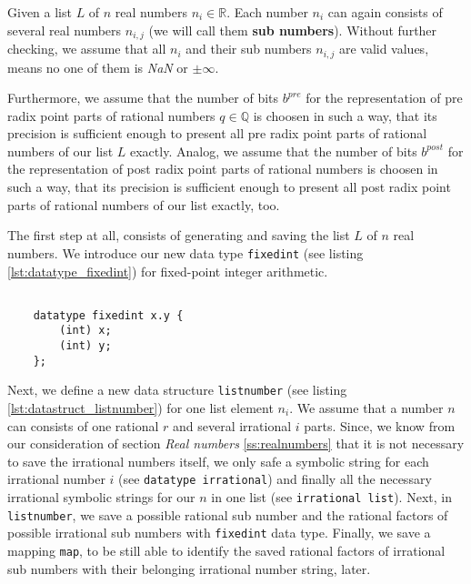 \begin{step}[Assumptions]
    Given a list $L$ of $n$ real numbers $n_{i} \in \mathbb{R}$. Each number $n_{i}$ can again consists of several real numbers $n_{i,j}$ (we will call them \textbf{sub numbers}). Without further checking, we assume that all $n_{i}$ and their sub numbers $n_{i,j}$ are valid values, means no one of them is \textit{NaN} or $\pm \infty$.

Furthermore, we assume that the number of bits $b^{pre}$ for the representation of pre radix point parts of rational numbers $q \in \mathbb{Q}$ is choosen in such a way, that its precision is sufficient enough to present all pre radix point parts of rational numbers of our list $L$ exactly. Analog, we assume that the number of bits $b^{post}$ for the representation of post radix point parts of rational numbers is choosen in such a way, that its precision is sufficient enough to present all post radix point parts of rational numbers of our list exactly, too.
\label{step:assumptions}
\end{step}

The first step at all, consists of generating and saving the list $L$ of $n$ real numbers. We introduce our new data type \texttt{fixedint} (see listing \ref{lst:datatype_fixedint}) for fixed-point integer arithmetic.

\begin{lstlisting}[caption=Data type \texttt{fixedint}, label=lst:datatype_fixedint]
    
    datatype fixedint x.y {
        (int) x;
        (int) y;
    };

\end{lstlisting}


Next, we define a new data structure \texttt{listnumber} (see listing \ref{lst:datastruct_listnumber}) for one list element $n_{i}$. We assume that a number $n$ can consists of one rational $r$ and several irrational $i$ parts. Since, we know from our consideration of section \textit{Real numbers} \ref{ss:realnumbers} that it is not necessary to save the irrational numbers itself, we only safe a symbolic string for each irrational number $i$ (see \texttt{datatype irrational}) and finally all the necessary irrational symbolic strings for our $n$ in one list (see \texttt{irrational list}). Next, in \texttt{listnumber}, we save a possible rational sub number and the rational factors of possible irrational sub numbers with \texttt{fixedint} data type. Finally, we save a mapping \texttt{map}, to be still able to identify the saved rational factors of irrational sub numbers with their belonging irrational number string, later.


